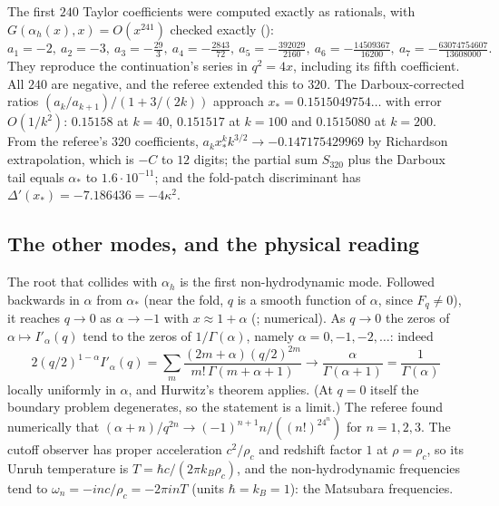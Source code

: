 The first $240$ Taylor coefficients were computed exactly as rationals, with $G(\alpha_h(x),x)=O(x^{241})$ checked exactly ():
\[
a_1=-2,\ a_2=-3,\ a_3=-\tfrac{29}3,\ a_4=-\tfrac{2843}{72},\ a_5=-\tfrac{392029}{2160},\ a_6=-\tfrac{14509367}{16200},\ a_7=-\tfrac{63074754607}{13608000}.
\]
They reproduce the continuation's series in $q^2=4x$, including its fifth coefficient. All $240$ are negative, and the referee extended this to $320$. The Darboux-corrected ratios $(a_k/a_{k+1})/(1+3/(2k))$ approach $x_*=0.1515049754\ldots$ with error $O(1/k^2)$: $0.15158$ at $k=40$, $0.151517$ at $k=100$ and $0.1515080$ at $k=200$. From the referee's $320$ coefficients, $a_kx_*^kk^{3/2}\to-0.147175429969$ by Richardson extrapolation, which is $-C$ to $12$ digits; the partial sum $S_{320}$ plus the Darboux tail equals $\alpha_*$ to $1.6\cdot10^{-11}$; and the fold-patch discriminant has $\Delta'(x_*)=-7.186436=-4\kappa^2$.

\subsection{The other modes, and the physical reading}

The root that collides with $\alpha_h$ is the first non-hydrodynamic mode. Followed backwards in $\alpha$ from $\alpha_*$ (near the fold, $q$ is a smooth function of $\alpha$, since $F_q\ne0$), it reaches $q\to0$ as $\alpha\to-1$ with $x\approx1+\alpha$ (; numerical). As $q\to0$ the zeros of $\alpha\mapsto I'_\alpha(q)$ tend to the zeros of $1/\Gamma(\alpha)$, namely $\alpha=0,-1,-2,\dots$: indeed
\[
2(q/2)^{1-\alpha}I'_\alpha(q)=\sum_m\frac{(2m+\alpha)(q/2)^{2m}}{m!\,\Gamma(m+\alpha+1)}\longrightarrow\frac{\alpha}{\Gamma(\alpha+1)}=\frac1{\Gamma(\alpha)}
\]
locally uniformly in $\alpha$, and Hurwitz's theorem applies. (At $q=0$ itself the boundary problem degenerates, so the statement is a limit.) The referee found numerically that $(\alpha+n)/q^{2n}\to(-1)^{n+1}n/((n!)^24^n)$ for $n=1,2,3$. The cutoff observer has proper acceleration $c^2/\rho_c$ and redshift factor $1$ at $\rho=\rho_c$, so its Unruh temperature is $T=\hbar c/(2\pi k_B\rho_c)$, and the non-hydrodynamic frequencies tend to $\omega_n=-inc/\rho_c=-2\pi inT$ (units $\hbar=k_B=1$): the Matsubara frequencies.


